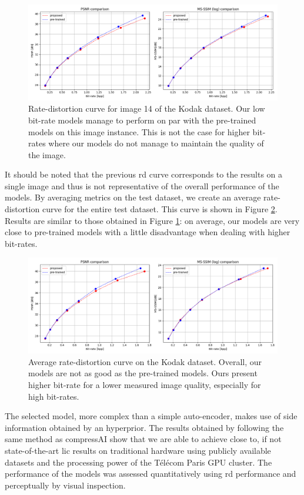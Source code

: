 \begin{figure}
    \centering
    \includegraphics[width=15cm]{img/bdpsnr_3.png}
    \caption[Rate-distortion curve for image 14 of the Kodak dataset.]{Rate-distortion curve for image 14 of the Kodak dataset. Our low bit-rate models manage to perform on par with the pre-trained models on this image instance. This is not the case for higher bit-rates where our models do not manage to maintain the quality of the image.}
    \label{bdpsnr_2}
\end{figure}

It should be noted that the previous \acrshort{rd} curve corresponds to the results on a single image and thus is not representative of the overall performance of the models. By averaging metrics on the test dataset, we create an average rate-distortion curve for the entire test dataset. This curve is shown in Figure \ref{bdpsnr_3}. Results are similar to those obtained in Figure \ref{bdpsnr_2}: on average, our models are very close to pre-trained models with a little disadvantage when dealing with higher bit-rates.

\begin{figure}
    \centering
    \includegraphics[width=15cm]{img/bdpsnr_4.png}
    \caption[Average rate-distortion curve on the Kodak dataset.]{Average rate-distortion curve on the Kodak dataset. Overall, our models are not as good as the pre-trained models. Ours present higher bit-rate for a lower measured image quality, especially for high bit-rates.}
    \label{bdpsnr_3}
\end{figure}

The selected model, more complex than a simple auto-encoder, makes use of side information obtained by an hyperprior. The results obtained by following the same method as compressAI show that we are able to achieve close to, if not state-of-the-art \acrshort{lic} results on traditional hardware using publicly available datasets and the processing power of the Télécom Paris GPU cluster. The performance of the models was assessed quantitatively using \acrshort{rd} performance and perceptually by visual inspection.